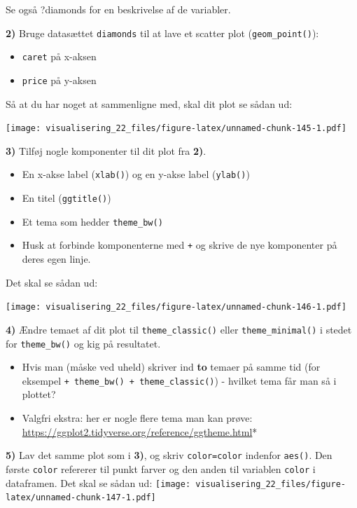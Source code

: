 \documentclass[
]{book}
\providecommand{\tightlist}{%
  \setlength{\itemsep}{0pt}\setlength{\parskip}{0pt}}
\begin{document}
Se også ?diamonds for en beskrivelse af de variabler.

\textbf{2)} Bruge datasættet \texttt{diamonds} til at lave et scatter plot (\texttt{geom\_point()}):

\begin{itemize}
\tightlist
\item
  \texttt{caret} på x-aksen
\item
  \texttt{price} på y-aksen
\end{itemize}

Så at du har noget at sammenligne med, skal dit plot se sådan ud:

\texttt{[image: visualisering\_22\_files/figure-latex/unnamed-chunk-145-1.pdf]}

\textbf{3)} Tilføj nogle komponenter til dit plot fra \textbf{2)}.

\begin{itemize}
\tightlist
\item
  En x-akse label (\texttt{xlab()}) og en y-akse label (\texttt{ylab()})
\item
  En titel (\texttt{ggtitle()})
\item
  Et tema som hedder \texttt{theme\_bw()}
\item
  Husk at forbinde komponenterne med \texttt{+} og skrive de nye komponenter på deres egen linje.
\end{itemize}

Det skal se sådan ud:

\texttt{[image: visualisering\_22\_files/figure-latex/unnamed-chunk-146-1.pdf]}

\textbf{4)} Ændre temaet af dit plot til \texttt{theme\_classic()} eller \texttt{theme\_minimal()} i stedet for \texttt{theme\_bw()} og kig på resultatet.

\begin{itemize}
\tightlist
\item
  Hvis man (måske ved uheld) skriver ind \textbf{to} temaer på samme tid (for eksempel \texttt{+\ theme\_bw()\ +\ theme\_classic()}) - hvilket tema får man så i plottet?
\item
  Valgfri ekstra: her er nogle flere tema man kan prøve: \url{https://ggplot2.tidyverse.org/reference/ggtheme.html}*
\end{itemize}

\textbf{5)} Lav det samme plot som i \textbf{3)}, og skriv \texttt{color=color} indenfor \texttt{aes()}. Den første \texttt{color} refererer til punkt farver og den anden til variablen \texttt{color} i dataframen.
Det skal se sådan ud:
\texttt{[image: visualisering\_22\_files/figure-latex/unnamed-chunk-147-1.pdf]}
\end{document}
